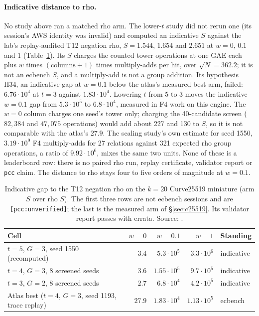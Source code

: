 \paragraph{Indicative distance to rho.} No study above ran a matched rho
arm. The lower-$t$ study did not rerun one (its session's AWS identity was
invalid) and computed an indicative $S$ against the lab's replay-audited
T12 negation rho, $S=1.544$, $1.654$ and $2.651$ at $w=0$, $0.1$ and $1$
(Table~\ref{tab:iso-seed-gap}). Its $S$ charges the counted tower
operations at one GAE each plus $w$ times $(\text{columns}+1)$ times
multiply-adds per hit, over $\sqrt N=362.2$; it is not an ecbench $S$, and
a multiply-add is not a group addition. Its hypothesis H34, an indicative
gap at $w=0.1$ below the atlas's measured best arm, failed: $6.76\cdot10^4$
at $t=3$ against $1.83\cdot10^4$. Lowering $t$ from 5 to 3 moves the
indicative $w=0.1$ gap from $5.3\cdot10^5$ to $6.8\cdot10^4$, measured in
F4 work on this engine. The $w=0$ column charges one seed's tower only;
charging the 40-candidate screen ($82{,}384$ and $47{,}075$ operations)
would add about 227 and 130 to $S$, so it is not comparable with the
atlas's $27.9$. The scaling study's own estimate for seed 1550,
$3.19\cdot10^9$ F4 multiply-adds for 27 relations against 321 expected rho
group operations, a ratio of $9.92\cdot10^6$, mixes the same two units.
None of these is a leaderboard row: there is no paired rho run, replay
certificate, validator report or \texttt{pcc} claim. The distance to rho
stays four to five orders of magnitude at $w=0.1$.

\begin{table}[t]
\centering\small
\begin{tabular}{@{}lrrrl@{}}
\toprule
Cell & $w=0$ & $w=0.1$ & $w=1$ & Standing \\
\midrule
$t=5$, $G=3$, seed 1550 (recomputed) & $3.4$ & $5.3\cdot10^5$ & $3.3\cdot10^6$ & indicative \\
$t=4$, $G=3$, 8 screened seeds & $3.6$ & $1.55\cdot10^5$ & $9.7\cdot10^5$ & indicative \\
$t=3$, $G=2$, 8 screened seeds & $2.7$ & $6.8\cdot10^4$ & $4.2\cdot10^5$ & indicative \\
\addlinespace
Atlas best ($t=4$, $G=3$, seed 1193, trace replay) & $27.9$ & $1.83\cdot10^4$ & $1.13\cdot10^5$ & ecbench \\
\bottomrule
\end{tabular}
\caption[]{Indicative gap to the T12 negation rho on the $k=20$
Curve25519 miniature (arm $S$ over rho $S$). The first three rows are not
ecbench sessions and are \texttt{[pcc:unverified]}; the last is the measured arm of \S\ref{sec:c25519}. Its validator report passes with errata.
Source: .}
\label{tab:iso-seed-gap}
\end{table}

